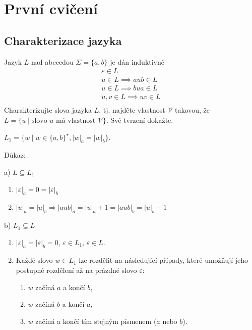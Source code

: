 \section{První cvičení}

\subsection{Charakterizace jazyka}
Jazyk $L$ nad abecedou $\Sigma = \{a,b\}$ je dán induktivně
\begin{gather*}
    \varepsilon \in L \\
    u \in L \implies aub \in L\\
    u \in L \implies bua \in L\\
    u, v \in L \implies uv \in L\\
\end{gather*}
Charakterizujte slova jazyka $L$, tj. najděte vlastnost $\mathcal{V}$ takovou, že $L = \{u \mid \text{slovo } u
\text{ má vlastnost } \mathcal{V}\}$. Své tvrzení dokažte.

$L_1 = \{w \mid w \in \{a,b\}^\star, |w|_a=|w|_b\}$.

Důkaz:

a) $L \subseteq L_1$

\begin{enumerate}
    \item $|\varepsilon|_a = 0 = |\varepsilon|_b$
    \item $|u|_a = |u|_b \Rightarrow |aub|_a = |u|_a + 1 = |aub|_b = |u|_b + 1$
\end{enumerate}

b) $L_1 \subseteq L$

\begin{enumerate}
    \item $|\varepsilon|_a = |\varepsilon|_b = 0$, $\varepsilon \in L_1$, $\varepsilon \in L$.
    \item Každé slovo $w \in L_1$ lze rozdělit na následující případy, které umožňují jeho postupné rozdělení až na
    prázdné slovo $\varepsilon$:
    \begin{enumerate}[label={}, noitemsep]
        \item {} $w$ začíná $a$ a končí $b$,
        \item {} $w$ začíná $b$ a končí $a$,
        \item {} $w$ začíná a končí tím stejným písmenem ($a$ nebo $b$).
    \end{enumerate}
\end{enumerate}

